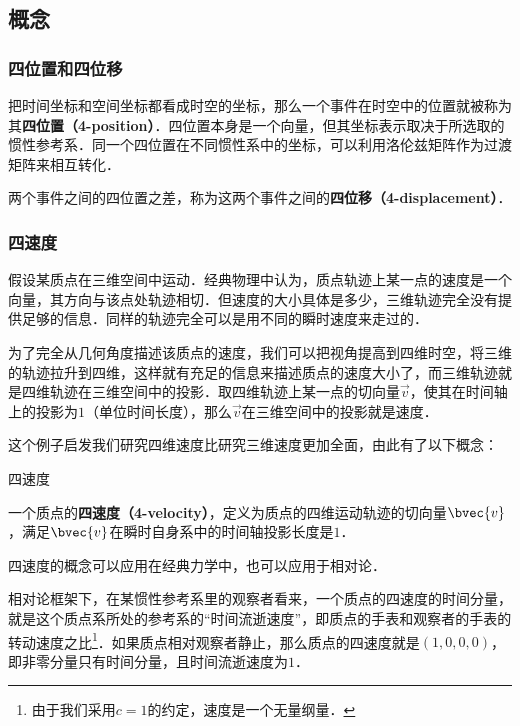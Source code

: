 

\subsection{概念}
\subsubsection{四位置和四位移}
把时间坐标和空间坐标都看成时空的坐标，那么一个事件在时空中的位置就被称为其\textbf{四位置（4-position）}．四位置本身是一个向量，但其坐标表示取决于所选取的惯性参考系．同一个四位置在不同惯性系中的坐标，可以利用洛伦兹矩阵作为过渡矩阵来相互转化．

两个事件之间的四位置之差，称为这两个事件之间的\textbf{四位移（4-displacement）}．

\subsubsection{四速度}

假设某质点在三维空间中运动．经典物理中认为，质点轨迹上某一点的速度是一个向量，其方向与该点处轨迹相切．但速度的大小具体是多少，三维轨迹完全没有提供足够的信息．同样的轨迹完全可以是用不同的瞬时速度来走过的．

为了完全从几何角度描述该质点的速度，我们可以把视角提高到四维时空，将三维的轨迹拉升到四维，这样就有充足的信息来描述质点的速度大小了，而三维轨迹就是四维轨迹在三维空间中的投影．取四维轨迹上某一点的切向量$\vec{v}$，使其在时间轴上的投影为$1$（单位时间长度），那么$\vec{v}$在三维空间中的投影就是速度．

这个例子启发我们研究四维速度比研究三维速度更加全面，由此有了以下概念：

\begin{definition}{四速度}

一个质点的\textbf{四速度（4-velocity）}，定义为质点的四维运动轨迹的切向量$\bvec{v}$，满足$\bvec{v}$在瞬时自身系中的时间轴投影长度是$1$．

\end{definition}

四速度的概念可以应用在经典力学中，也可以应用于相对论．

相对论框架下，在某惯性参考系里的观察者看来，一个质点的四速度的时间分量，就是这个质点系所处的参考系的“时间流逝速度”，即质点的手表和观察者的手表的转动速度之比\footnote{由于我们采用$c=1$的约定，速度是一个无量纲量．}．如果质点相对观察者静止，那么质点的四速度就是$(1,0,0,0)$，即非零分量只有时间分量，且时间流逝速度为$1$．

